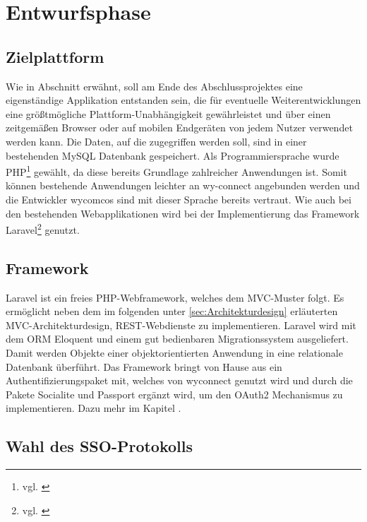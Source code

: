 \section{Entwurfsphase} 
\label{sec:Entwurfsphase}

\subsection{Zielplattform}
\label{sec:Zielplattform}

Wie in Abschnitt  erwähnt, soll am Ende des Abschlussprojektes eine eigenständige Applikation entstanden sein, die für eventuelle Weiterentwicklungen eine größtmögliche Plattform-Unabhängigkeit gewährleistet und über einen zeitgemäßen Browser oder auf mobilen Endgeräten von jedem Nutzer verwendet werden kann. 
Die Daten, auf die zugegriffen werden soll, sind in einer bestehenden MySQL Datenbank gespeichert. 
Als Programmiersprache wurde \ac{PHP}\footnote{vgl. \cite{PHP}} gewählt, da diese bereits Grundlage zahlreicher Anwendungen ist. Somit können bestehende Anwendungen leichter an wy-connect angebunden werden und die Entwickler wycomcos sind mit dieser Sprache bereits vertraut. 
Wie auch bei den bestehenden Webapplikationen wird bei der Implementierung das Framework Laravel\footnote{vgl. \cite{Laravel}} genutzt.

\subsection{Framework}
\label{sec:Framework}

Laravel ist ein freies \ac{PHP}-Webframework, welches dem \ac{MVC}-Muster folgt. Es ermöglicht neben dem im folgenden unter \ref{sec:Architekturdesign} erläuterten \ac{MVC}-Architekturdesign, \ac{REST}-Webdienste zu implementieren. Laravel wird mit dem \ac{ORM} Eloquent und einem gut bedienbaren Migrationssystem ausgeliefert. Damit werden Objekte einer objektorientierten Anwendung in eine relationale Datenbank überführt.
Das Framework bringt von Hause aus ein Authentifizierungspaket mit, welches von wyconnect genutzt wird und durch die Pakete Socialite und Passport ergänzt wird, um den OAuth2 Mechanismus zu implementieren. Dazu mehr im Kapitel .

\subsection{Wahl des SSO-Protokolls}
\label{sec:Protokollwahl}

